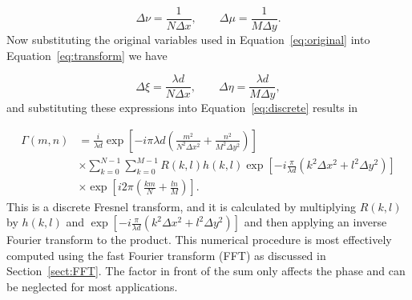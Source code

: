     \begin{equation}
        \Delta\nu=\frac{1}{N\Delta x}, \qquad \Delta\mu=\frac{1}{M\Delta y}.
        \label{eq:transform}
    \end{equation}
    Now substituting the original variables used in Equation~\ref{eq:original} into
    Equation~\ref{eq:transform} we have

    \begin{equation}
        \Delta\xi=\frac{\lambda d}{N\Delta x}, \qquad \Delta\eta=\frac{
        \lambda d}{M\Delta y},
    \end{equation}
    and substituting these expressions into Equation~\ref{eq:discrete} results
    in

    \begin{equation}
    \begin{aligned}
        \Gamma(m,n) & = \frac{i}{\lambda d}\exp\left[ -i\pi \lambda d\left(
            \frac{m^2}{N^2\Delta x^2}+\frac{n^2}{M^2\Delta y^2}
        \right)\right]\\
        &\times
        \sum_{k=0}^{N-1}\sum_{k=0}^{M-1}R(k,l)h(k,l)\exp\left[ -i
        \frac{\pi}{\lambda d}\left( k^2\Delta x^2+l^2\Delta y^2 \right)
    \right] \\
    &\times \exp\left[ i2\pi\left( \frac{km}{N}+\frac{ln}{M} \right) \right].
    \end{aligned}
    \end{equation}
    This is a discrete Fresnel transform, and it is calculated by multiplying
    $R(k,l)$ by $h(k,l)$ and $\exp\left[ -i
        \frac{\pi}{\lambda d}\left( k^2\Delta x^2+l^2\Delta y^2 \right)
    \right]$
    and then applying an inverse Fourier transform to the product. This
    numerical procedure is
    most effectively computed using the fast Fourier transform (FFT) as
    discussed in Section~\ref{sect:FFT}. The factor
    in front of the sum only affects the phase and can be neglected for
    most applications.


